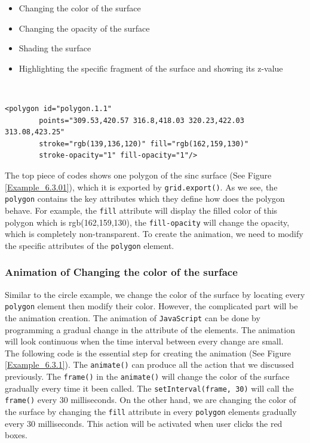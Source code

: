 \documentclass[11pt,twoside]{report}
\begin{document}
\begin{itemize}
	\item Changing the color of the surface
	\item Changing the opacity of the surface
	\item Shading the surface
	\item Highlighting the specific fragment of the surface and showing its z-value  
\end{itemize}
\\

\begin{lstlisting}
<polygon id="polygon.1.1" 
        points="309.53,420.57 316.8,418.03 320.23,422.03 313.08,423.25" 
        stroke="rgb(139,136,120)" fill="rgb(162,159,130)" 
        stroke-opacity="1" fill-opacity="1"/>
\end{lstlisting}
The top piece of codes shows one polygon of the sinc surface (See Figure \ref{Example_6.3.01}), which it is exported by \texttt{grid.export()}. As we see, the \texttt{polygon} contains the key attributes which they define how does the polygon behave. For example, the \texttt{fill} attribute will display the filled color of this polygon which is rgb(162,159,130), the \texttt{fill-opacity} will change the opacity, which is completely non-transparent.
To create the animation, we need to modify the specific attributes of the \texttt{polygon} element. 
 
\newpage
\subsubsection*{Animation of Changing the color of the surface}
Similar to the circle example, we change the color of the surface by locating every \texttt{polygon} element then modify their color. However, the complicated part will be the animation creation. The animation of \texttt{JavaScript} can be done by programming a gradual change in the attribute of the elements. The animation will look continuous when the time interval between every change are small.\\

The following code is the essential step for creating the animation (See Figure \ref{Example_6.3.1}). The \texttt{animate()} can produce all the action that we discussed previously. The \texttt{frame()} in the \texttt{animate()} will change the color of the surface gradually every time it been called.  The \texttt{setInterval(frame, 30)} will call the \texttt{frame()} every 30 milliseconds. On the other hand, we are changing the color of the surface by changing the \texttt{fill} attribute in every \texttt{polygon} elements gradually every 30 milliseconds. This action will be activated when user clicks the red boxes.
\end{document}
